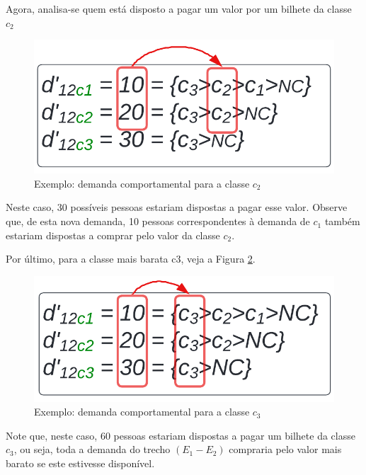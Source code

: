 Agora, analisa-se quem está disposto a pagar um valor por um bilhete da classe $c_2$
\begin{figure}[H]
	\begin{center}
		\includegraphics[scale=0.24]{img/dem_compo_c2.png}
		\caption{Exemplo: demanda comportamental para a classe $c_2$}
		\label{fig: exemplo_dem_c2}
	\end{center}
\end{figure}

Neste caso, 30 possíveis pessoas estariam dispostas a pagar esse valor. Observe que, de esta nova demanda, 10 pessoas correspondentes à demanda de $c_1$ também estariam dispostas a comprar pelo valor da classe $c_2$.

Por último, para a classe mais barata c3, veja a Figura \ref{fig: exemplo_dem_c3}.
\begin{figure}[H]
	\begin{center}
		\includegraphics[scale=0.24]{img/dem_compo_c3.png}
		\caption{Exemplo: demanda comportamental para a classe $c_3$}
		\label{fig: exemplo_dem_c3}
	\end{center}
\end{figure}
Note que, neste caso, 60 pessoas estariam dispostas a pagar um bilhete da classe $c_3$, ou seja, toda a demanda do trecho $(E_1-E_2)$ compraria pelo valor mais barato se este estivesse disponível.

